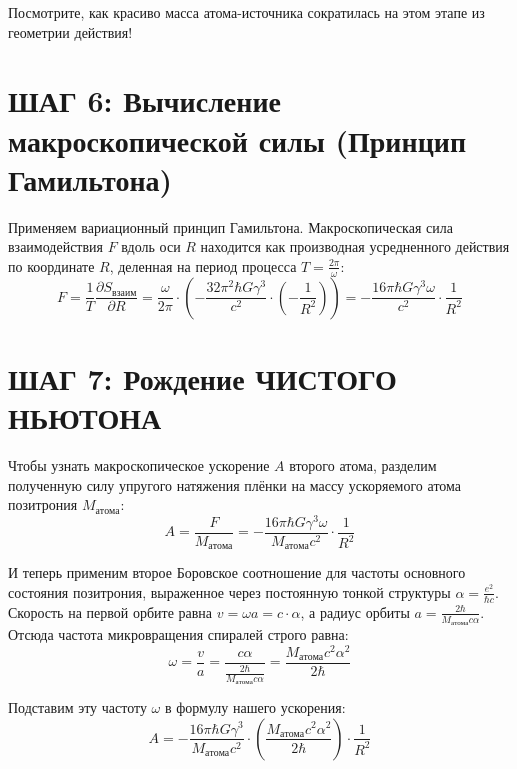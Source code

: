 \documentclass[12pt,a4paper]{article}
\begin{document}
Посмотрите, как красиво масса атома-источника сократилась на этом этапе из геометрии действия!

\section*{ШАГ 6: Вычисление макроскопической силы (Принцип Гамильтона)}

Применяем вариационный принцип Гамильтона. Макроскопическая сила взаимодействия $F$ вдоль оси $R$ находится как производная усредненного действия по координате $R$, деленная на период процесса $T = \frac{2\pi}{\omega}$:
\begin{equation}
F = \frac{1}{T} \frac{\partial S_{взаим}}{\partial R} = \frac{\omega}{2\pi} \cdot \left( - \frac{32 \pi^2 \hbar G \gamma^3}{c^2} \cdot \left( -\frac{1}{R^2} \right) \right) = - \frac{16\pi \hbar G \gamma^3 \omega}{c^2} \cdot \frac{1}{R^2}
\end{equation}

\section*{ШАГ 7: Рождение ЧИСТОГО НЬЮТОНА}

Чтобы узнать макроскопическое ускорение $A$ второго атома, разделим полученную силу упругого натяжения плёнки на массу ускоряемого атома позитрония $M_{атома}$:
\begin{equation}
A = \frac{F}{M_{атома}} = - \frac{16\pi \hbar G \gamma^3 \omega}{M_{атома} c^2} \cdot \frac{1}{R^2}
\end{equation}

И теперь применим второе Боровское соотношение для частоты основного состояния позитрония, выраженное через постоянную тонкой структуры $\alpha = \frac{e^2}{\hbar c}$. Скорость на первой орбите равна $v = \omega a = c \cdot \alpha$, а радиус орбиты $a = \frac{2\hbar}{M_{атома} c \alpha}$. Отсюда частота микровращения спиралей строго равна:
\begin{equation}
\omega = \frac{v}{a} = \frac{c \alpha}{\frac{2\hbar}{M_{атома} c \alpha}} = \frac{M_{атома} c^2 \alpha^2}{2\hbar}
\end{equation}

Подставим эту частоту $\omega$ в формулу нашего ускорения:
\begin{equation}
A = - \frac{16\pi \hbar G \gamma^3}{M_{атома} c^2} \cdot \left( \frac{M_{атома} c^2 \alpha^2}{2\hbar} \right) \cdot \frac{1}{R^2}
\end{equation}
\end{document}
